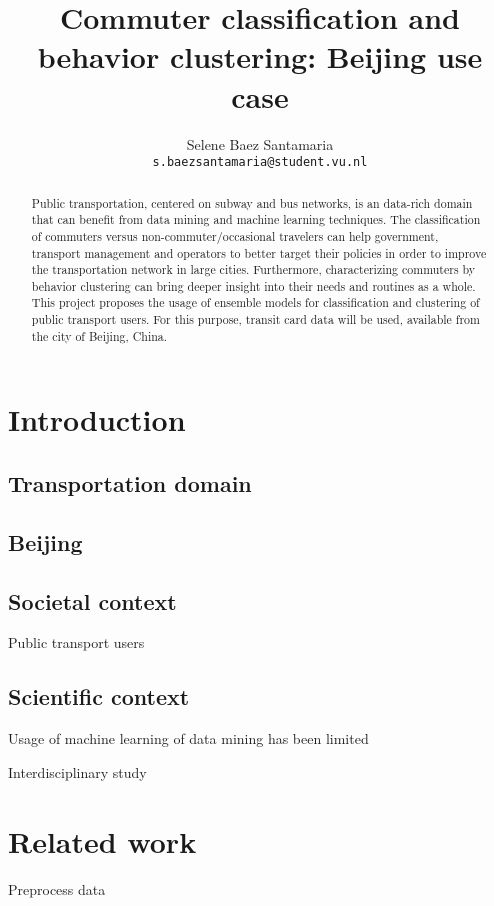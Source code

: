 \documentclass{article}
\title{Commuter classification and behavior clustering: Beijing use case}
\author{
  Selene Baez  Santamaria \\
  \texttt{s.baezsantamaria@student.vu.nl}
}
\begin{document}

\maketitle

\begin{abstract}
  Public transportation, centered on subway and bus networks, is an data-rich domain that can benefit from data mining and machine learning techniques. The classification of commuters versus non-commuter/occasional travelers can help government, transport management and operators to better target their policies in order to improve the transportation network in large cities. Furthermore, characterizing commuters by behavior clustering can bring deeper insight into their needs and routines as a whole. 
  This project proposes the usage of ensemble models for classification and clustering of public transport users. For this purpose, transit card data will be used, available from the city of Beijing, China. 
\end{abstract}

\section{Introduction}

\subsection{Transportation domain}

\subsection{Beijing}

\subsection{Societal context}
Public transport users

\subsection{Scientific context}
Usage of machine learning of data mining has been limited

Interdisciplinary study


\section{Related work}
Preprocess data 
\end{document}
